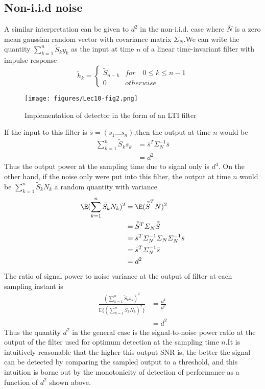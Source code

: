 \documentclass[12pt]{report}
\begin{document}
\subsection{Non-i.i.d noise} A similar interpretation can be given to $d^2$ in the non-i.i.d. case where $\bar{N}$ is a zero mean gaussian random vector with covariance matrix $\varSigma_{N}$.We can write the quantity $\sum_{k=1}^{n}\tilde{S}_ky_k $ as the input at time $n$ of a linear time-invariant filter with impulse response
\[\tilde{h}_k=\begin{cases}
\tilde{S}_{n-k} &for \quad0\leq k \leq n-1\\ 0 &otherwise
\end{cases}\]
\begin{figure}
	\begin{center}
		\texttt{[image: figures/Lec10-fig2.png]}\caption{Implementation of detector in the form of an LTI filter}
	\end{center}
\end{figure}
If the input to this filter is $\bar{s}= (s_1\dots s_n)$,then the output at time $n$ would be
\begin{align*}
\sum_{k=1}^{n}\tilde{S}_ks_k&= \bar{s}^T\varSigma_{N}^{-1}\bar{s}\\&= d^2
\end{align*}
Thus the output power at the sampling time due to signal only is $d^4$. On the other hand, if the noise only were put into this filter, the output at time $n$ would be $\sum_{k=1}^{n}\tilde{S}_kN_k $ a random quantity with variance
\begin{align*}
\E(\sum_{k=1}^{n}\tilde{S}_kN_k)^2&=\E({\bar{\tilde{S}}}^T\bar{N})^2\\ &=\bar{\tilde{S}}^T\varSigma_{N}\bar{\tilde{S}}\\ &=\bar{s}^T\varSigma_{N}^{-1}\varSigma_{N}\varSigma_{N}^{-1}\bar{s}\\ &=\bar{s}^T\varSigma_{N}^{-1}\bar{s}\\ &= d^2
\end{align*}
The ratio of signal power to noise variance at the output of filter at each sampling instant is
\begin{align*}
\frac{(\sum_{k=1}^{n}\tilde{S}_ks_k)^2}{\mathbb{E}\lbrace( \sum_{k=1}^{n}\tilde{S}_kN_k)^2\rbrace}&= \frac{d^4}{d^2}\\&=d^2
\end{align*}
Thus the quantity $d^2$ in the general case is the signal-to-noise power ratio at the output of the filter used for optimum detection at the sampling time $n$.It is intuitively reasonable that the higher this output SNR is, the better the signal can be detected by comparing the sampled output to a threshold, and this intuition is borne out by the monotonicity of detection of performance as a function of $d^2$ shown above.\\
\end{document}
